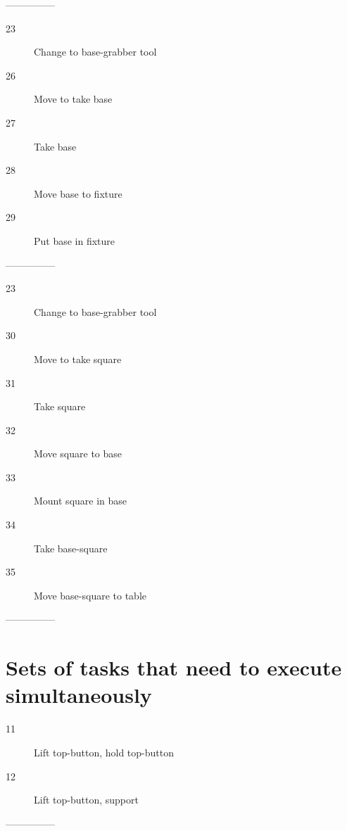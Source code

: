 \documentclass[10pt,a4paper]{report}
\begin{document}
---------------
\begin{description}
\item[23] Change to base-grabber tool
\item[26] Move to take base
\item[27] Take base
\item[28] Move base to fixture
\item[29] Put base in fixture
\end{description}
---------------
\begin{description}
\item[23] Change to base-grabber tool
\item[30] Move to take square
\item[31] Take square
\item[32] Move square to base
\item[33] Mount square in base
\item[34] Take base-square
\item[35] Move base-square to table
\end{description}
---------------

\section*{Sets of tasks that need to execute simultaneously}
\begin{description}
\item[11] Lift top-button, hold top-button
\item[12] Lift top-button, support
\end{description}
---------------
\end{document}
